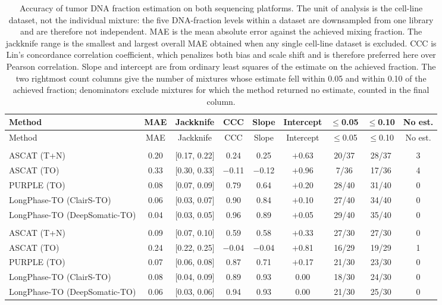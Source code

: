 \documentclass[pdflatex,sn-nature]{sn-jnl}
\begin{document}
{\footnotesize
\begin{longtable}{@{}lcccccccc@{}}
\caption[Accuracy of tumor DNA fraction estimation]%
  {Accuracy of tumor DNA fraction estimation on both sequencing platforms. The unit of analysis is the cell-line dataset, not the individual mixture: the five DNA-fraction levels within a dataset are downsampled from one library and are therefore not independent. MAE is the mean absolute error against the achieved mixing fraction. The jackknife range is the smallest and largest overall MAE obtained when any single cell-line dataset is excluded. CCC is Lin's concordance correlation coefficient, which penalizes both bias and scale shift and is therefore preferred here over Pearson correlation. Slope and intercept are from ordinary least squares of the estimate on the achieved fraction.
  The two rightmost count columns give the number of mixtures whose estimate fell within 0.05 and
  within 0.10 of the achieved fraction; denominators exclude mixtures for which the method returned
  no estimate, counted in the final column.}
  \label{tab:tdf-accuracy-summary}\\
  \toprule
  Method & MAE & Jackknife & CCC & Slope & Intercept & $\le$0.05 & $\le$0.10 & No est. \\
  \midrule
  \endfirsthead
  \toprule
  Method & MAE & Jackknife & CCC & Slope & Intercept & $\le$0.05 & $\le$0.10 & No est. \\
  \midrule
  \endhead
  \bottomrule
  \endlastfoot
  \multicolumn{9}{@{}l}{\emph{Nanopore panel (8 cell-line datasets, 40 mixtures)}} \\
  ASCAT (T+N) & 0.20 & [0.17, 0.22] & 0.24 & 0.25 & $+$0.63 & 20/37 & 28/37 & 3 \\
  ASCAT (TO) & 0.33 & [0.30, 0.33] & $-$0.11 & $-$0.12 & $+$0.96 & 7/36 & 17/36 & 4 \\
  PURPLE (TO) & 0.08 & [0.07, 0.09] & 0.79 & 0.64 & $+$0.20 & 28/40 & 31/40 & 0 \\
  LongPhase-TO (ClairS-TO) & 0.06 & [0.03, 0.07] & 0.90 & 0.84 & $+$0.10 & 27/40 & 34/40 & 0 \\
  LongPhase-TO (DeepSomatic-TO) & 0.04 & [0.03, 0.05] & 0.96 & 0.89 & $+$0.05 & 29/40 & 35/40 & 0 \\
  \addlinespace
  \multicolumn{9}{@{}l}{\emph{PacBio HiFi panel (6 cell-line datasets, 30 mixtures)}} \\
  ASCAT (T+N) & 0.09 & [0.07, 0.10] & 0.59 & 0.58 & $+$0.33 & 27/30 & 27/30 & 0 \\
  ASCAT (TO) & 0.24 & [0.22, 0.25] & $-$0.04 & $-$0.04 & $+$0.81 & 16/29 & 19/29 & 1 \\
  PURPLE (TO) & 0.07 & [0.06, 0.08] & 0.87 & 0.71 & $+$0.17 & 21/30 & 23/30 & 0 \\
  LongPhase-TO (ClairS-TO) & 0.08 & [0.04, 0.09] & 0.89 & 0.93 & 0.00 & 18/30 & 24/30 & 0 \\
  LongPhase-TO (DeepSomatic-TO) & 0.06 & [0.03, 0.06] & 0.94 & 0.93 & 0.00 & 21/30 & 25/30 & 0 \\

\end{longtable}
}
\end{document}

